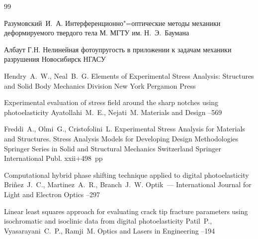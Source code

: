 \begin{thebibliography}{99}

\by Разумовский~И.~А.
\book Интерференционно"=оптические методы механики деформируемого твердого тела
\publaddr М.
\publ МГТУ им. Н.~Э.~Баумана


\by Албаут Г.Н.
\book Нелинейная фотоупругость в приложении к задачам механики разрушения
\publaddr Новосибирск
\publ НГАСУ


\by Hendry~A.~W., Neal~B.~G.
\book Elements of Experimental Stress Analysis: Structures and Solid Body Mechanics Division
\publaddr New York
\publ Pergamon Press 

\paper Experimental evaluation of stress field around the sharp notches using photoelasticity
\by  Ayatollahi~M.~E., Nejati~M.
\jour  Materials and Design
--569

\by Freddi~A., Olmi~G., Cristofolini~L.  
\book Experimental Stress Analysis for Materials and Structures. 
Stress Analysis Models for Developing Design Methodologies
\serial Springer Series in Solid and Structural Mechanics
\publaddr Switzerland
\publ Springer International Publ.
\totalpages xxii+498~pp \nofrills
{}


\paper Computational hybrid phase shifting technique applied to digital photoelasticity
\by  Bri\~nez~J.~C., Martinez~A.~R., Branch~J.~W.
\jour  Optik~--- International Journal for Light and Electron Optics
--297


\paper Linear least squares approach for evaluating crack tip fracture parameters using isochromatic and isoclinic data from digital photoelasticity
\by   Patil~P., Vyasarayani~C.~P., Ramji~M.
\jour  Optics and Lasers in Engineering
--194



\end{thebibliography}
